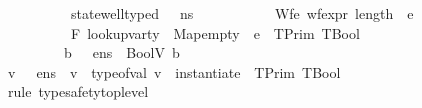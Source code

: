 \begin{isabellebody}
\ \ \ \ \ \ \ \ \ \ {\isachardoublequoteopen}state{\isacharunderscore}{\kern0pt}well{\isacharunderscore}{\kern0pt}typed\ {\isasymLambda}\ {\isacharbrackleft}{\kern0pt}{\isacharbrackright}{\kern0pt}\ n{\isacharunderscore}{\kern0pt}s{\isachardoublequoteclose}\ \isanewline
\ \ \ \ \ \ \ \ \ \ Wf{\isacharunderscore}{\kern0pt}e{\isacharcolon}{\kern0pt}\ {\isachardoublequoteopen}wf{\isacharunderscore}{\kern0pt}expr\ {\isacharparenleft}{\kern0pt}length\ {\isacharbrackleft}{\kern0pt}{\isacharbrackright}{\kern0pt}{\isacharparenright}{\kern0pt}\ e{\isachardoublequoteclose}\ \isanewline
\ \ \ \ \ \ \ \ \ \ {\isachardoublequoteopen}F{\isacharcomma}{\kern0pt}\ {\isacharparenleft}{\kern0pt}lookup{\isacharunderscore}{\kern0pt}var{\isacharunderscore}{\kern0pt}ty\ {\isasymLambda}{\isacharcomma}{\kern0pt}\ Map{\isachardot}{\kern0pt}empty{\isacharparenright}{\kern0pt}\ {\isasymturnstile}\ e\ {\isacharcolon}{\kern0pt}\ TPrim\ TBool{\isachardoublequoteclose}\isanewline
\ \ \ \ \ \ \ \ \ {\isachardoublequoteopen}{\isasymexists}b{\isachardot}{\kern0pt}\ {\isacharparenleft}{\kern0pt}{\isasymLambda}{\isacharcomma}{\kern0pt}{\isasymGamma}{\isacharcomma}{\kern0pt}{\isacharbrackleft}{\kern0pt}{\isacharbrackright}{\kern0pt}\ {\isasymturnstile}\ {\isasymlangle}e{\isacharcomma}{\kern0pt}n{\isacharunderscore}{\kern0pt}s{\isasymrangle}\ {\isasymDown}\ {\isacharparenleft}{\kern0pt}BoolV\ b{\isacharparenright}{\kern0pt}{\isacharparenright}{\kern0pt}{\isachardoublequoteclose}\isanewline
%
\isadelimproof
%
\endisadelimproof
%
\isatagproof
{}\isamarkupfalse%
\ {\isacharminus}{\kern0pt}\isanewline
\ \ \isamarkupfalse%
\ {\isachardoublequoteopen}{\isasymexists}v{\isachardot}{\kern0pt}\ {\isacharparenleft}{\kern0pt}{\isasymLambda}{\isacharcomma}{\kern0pt}{\isasymGamma}{\isacharcomma}{\kern0pt}{\isacharbrackleft}{\kern0pt}{\isacharbrackright}{\kern0pt}\ {\isasymturnstile}\ {\isasymlangle}e{\isacharcomma}{\kern0pt}n{\isacharunderscore}{\kern0pt}s{\isasymrangle}\ {\isasymDown}\ v{\isacharparenright}{\kern0pt}\ {\isasymand}\ type{\isacharunderscore}{\kern0pt}of{\isacharunderscore}{\kern0pt}val\ v\ {\isacharequal}{\kern0pt}\ instantiate\ {\isacharbrackleft}{\kern0pt}{\isacharbrackright}{\kern0pt}\ {\isacharparenleft}{\kern0pt}TPrim\ TBool{\isacharparenright}{\kern0pt}{\isachardoublequoteclose}\isanewline
\ \ \ \ \isamarkupfalse%
\ {\isacharparenleft}{\kern0pt}rule\ type{\isacharunderscore}{\kern0pt}safety{\isacharunderscore}{\kern0pt}top{\isacharunderscore}{\kern0pt}level{\isacharparenright}{\kern0pt}\isanewline

\end{isabellebody}
